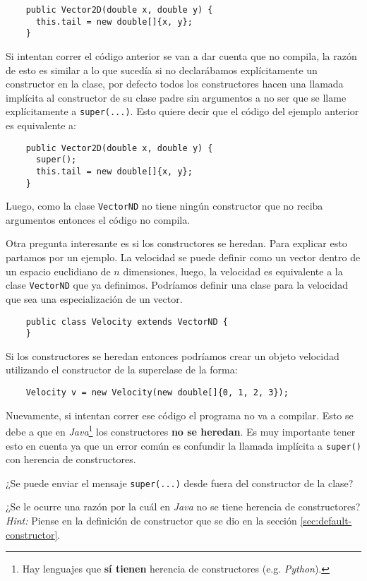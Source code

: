   \begin{verbatim}
    public Vector2D(double x, double y) {
      this.tail = new double[]{x, y};
    }
  \end{verbatim}
  
  Si intentan correr el código anterior se van a dar cuenta que no compila, la razón de esto es 
  similar a lo que sucedía si no declarábamos explícitamente un constructor en la clase, por defecto
  todos los constructores hacen una llamada implícita al constructor de su clase padre sin 
  argumentos a no ser que se llame explícitamente a \texttt{super(...)}.
  Esto quiere decir que el código del ejemplo anterior es equivalente a:

  \begin{verbatim}
    public Vector2D(double x, double y) {
      super();
      this.tail = new double[]{x, y};
    }
  \end{verbatim}

  Luego, como la clase \texttt{VectorND} no tiene ningún constructor que no reciba argumentos 
  entonces el código no compila.

  Otra pregunta interesante es si los constructores se heredan.
  Para explicar esto partamos por un ejemplo.
  La velocidad se puede definir como un vector dentro de un espacio euclidiano de \(n\) dimensiones,
  luego, la velocidad es equivalente a la clase \texttt{VectorND} que ya definimos.
  Podríamos definir una clase para la velocidad que sea una especialización de un vector.
  
  \begin{verbatim}
    public class Velocity extends VectorND {
    }
  \end{verbatim}

  Si los constructores se heredan entonces podríamos crear un objeto velocidad utilizando el 
  constructor de la superclase de la forma:

  \begin{verbatim}
    Velocity v = new Velocity(new double[]{0, 1, 2, 3});
  \end{verbatim}
  
  Nuevamente, si intentan correr ese código el programa no va a compilar.
  Esto se debe a que en \textit{Java}\footnote{Hay lenguajes que \textbf{sí tienen} herencia de 
  constructores (e.g. \textit{Python}).} los constructores \textbf{no se heredan}.
  Es muy importante tener esto en cuenta ya que un error común es confundir la llamada implícita a
  \texttt{super()} con herencia de constructores.

  \begin{exercise}
    ¿Se puede enviar el mensaje \texttt{super(...)} desde fuera del constructor de la 
    clase?
  \end{exercise}

  \begin{exercise}
    ¿Se le ocurre una razón por la cuál en \textit{Java} no se tiene herencia de constructores?
    \textit{Hint:} Piense en la definición de constructor que se dio en la sección 
    \ref{sec:default-constructor}.
  \end{exercise}